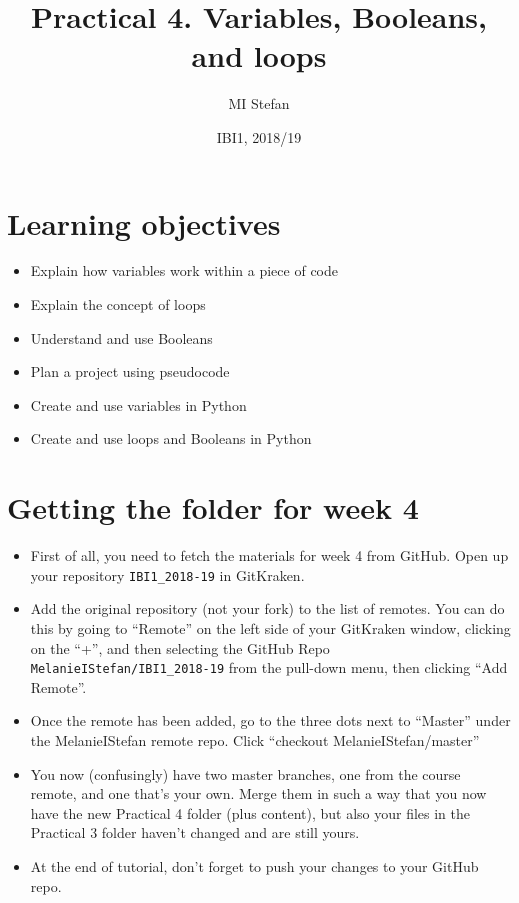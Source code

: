 \documentclass[pdflatex,a4paper]{article}
\title{Practical 4. Variables, Booleans, and loops}
\author{MI Stefan}
\date{IBI1, 2018/19}
\begin{document}
\newcommand{\<}{\textless}
\renewcommand{\>}{\textgreater}


\maketitle

\section{Learning objectives}

\begin{itemize}
\item
Explain how variables work within a piece of code
\item
Explain the concept of loops
\item
Understand and use Booleans
\item
Plan a project using pseudocode
\item
Create and use variables in Python 
\item
Create and use loops and Booleans in Python
\end{itemize}

\section{Getting the folder for week 4}

\begin{itemize}
\item
First of all, you need to fetch the materials for week 4 from GitHub. Open up your repository \verb=IBI1_2018-19= in GitKraken.
\item
Add the original repository (not your fork) to the list of remotes. You can do this by going to ``Remote'' on the left side of your GitKraken window, clicking on the ``+'', and then selecting the GitHub Repo \verb=MelanieIStefan/IBI1_2018-19= from the pull-down menu, then clicking ``Add Remote''. 
\item
Once the remote has been added, go to the three dots next to ``Master'' under the MelanieIStefan remote repo. Click ``checkout MelanieIStefan/master''
\item
You now (confusingly) have two master branches, one from the course remote, and one that's your own. Merge them in such a way that you now have the new Practical 4 folder (plus content), but also your files in the Practical 3 folder haven't changed and are still yours.
\item
At the end of tutorial, don't forget to push your changes to your GitHub repo. 
\end{itemize}
\end{document}
